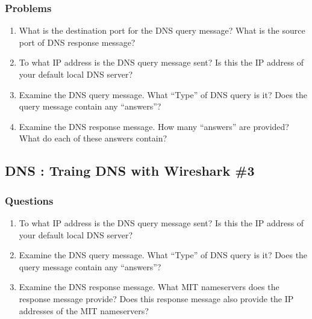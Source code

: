     \subsubsection*{Problems}
    \begin{enumerate}[label=\bfseries Problem \arabic*:,leftmargin=*,labelindent=1em]\addtocounter{enumi}{7}
        \item What is the destination port for the DNS query message? 
        What is the source port of DNS response message?\\[0.2mm]
            \soln
            
        \item To what IP address is the DNS query message sent? 
        Is this the IP address of your default local DNS server?\\[0.2mm]
            \soln
            
        \item Examine the DNS query message. What “Type” of DNS query is it? 
        Does the query message contain any “answers”?\\[0.2mm]
            \soln
            
        \item Examine the DNS response message. 
        How many “answers” are provided? What do each of these answers contain?\\[0.2mm]
            \soln
            
    \end{enumerate}
\subsection{DNS : Traing DNS with Wireshark \#3}
    \subsubsection*{Questions}
    \begin{enumerate}[label=\bfseries Problem \arabic*:,leftmargin=*,labelindent=1em]\addtocounter{enumi}{11}
        \item To what IP address is the DNS query message sent? 
        Is this the IP address of your default local DNS server?\\[0.2mm]
            \soln
            
        \item Examine the DNS query message. What “Type” of DNS query is it? 
        Does the query message contain any “answers”?\\[0.2mm]
            \soln
            
        \item Examine the DNS response message. What MIT nameservers does the response message provide? 
        Does this response message also provide the IP addresses of the MIT nameservers?\\[0.2mm]
            \soln
            
    \end{enumerate}
